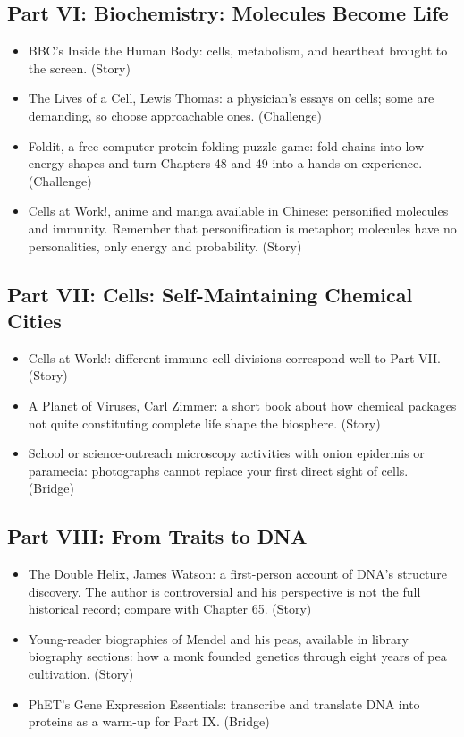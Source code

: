 \subsection*{Part VI: Biochemistry: Molecules Become Life}

\begin{itemize}[itemsep=2pt]
\item BBC's Inside the Human Body: cells, metabolism, and heartbeat brought to the screen. (Story)
\item The Lives of a Cell, Lewis Thomas: a physician's essays on cells; some are demanding, so choose approachable ones. (Challenge)
\item Foldit, a free computer protein-folding puzzle game: fold chains into low-energy shapes and turn Chapters 48 and 49 into a hands-on experience. (Challenge)
\item Cells at Work!, anime and manga available in Chinese: personified molecules and immunity. Remember that personification is metaphor; molecules have no personalities, only energy and probability. (Story)
\end{itemize}

\subsection*{Part VII: Cells: Self-Maintaining Chemical Cities}

\begin{itemize}[itemsep=2pt]
\item Cells at Work!: different immune-cell divisions correspond well to Part VII. (Story)
\item A Planet of Viruses, Carl Zimmer: a short book about how chemical packages not quite constituting complete life shape the biosphere. (Story)
\item School or science-outreach microscopy activities with onion epidermis or paramecia: photographs cannot replace your first direct sight of cells. (Bridge)
\end{itemize}

\subsection*{Part VIII: From Traits to DNA}

\begin{itemize}[itemsep=2pt]
\item The Double Helix, James Watson: a first-person account of DNA's structure discovery. The author is controversial and his perspective is not the full historical record; compare with Chapter 65. (Story)
\item Young-reader biographies of Mendel and his peas, available in library biography sections: how a monk founded genetics through eight years of pea cultivation. (Story)
\item PhET's Gene Expression Essentials: transcribe and translate DNA into proteins as a warm-up for Part IX. (Bridge)
\end{itemize}

